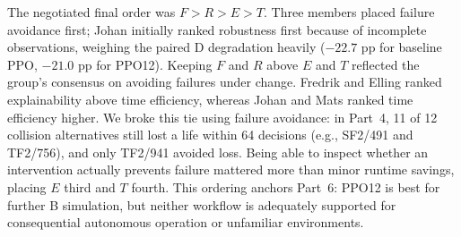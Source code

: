 The negotiated final order was $F>R>E>T$. Three members placed failure avoidance first; Johan
initially ranked robustness first because of incomplete observations, weighing the paired D
degradation heavily ($-22.7$ pp for baseline PPO, $-21.0$ pp for PPO12). Keeping $F$ and $R$
above $E$ and $T$ reflected the group's consensus on avoiding failures under change. Fredrik and
Elling ranked explainability above time efficiency, whereas Johan and Mats ranked time efficiency
higher. We broke this tie using failure avoidance: in Part~4, 11 of 12 collision alternatives
still lost a life within 64 decisions (e.g., SF2/491 and TF2/756), and only TF2/941 avoided loss.
Being able to inspect whether an intervention actually prevents failure mattered more than minor
runtime savings, placing $E$ third and $T$ fourth. This ordering anchors Part~6: PPO12 is best for
further B simulation, but neither workflow is adequately supported for consequential autonomous
operation or unfamiliar environments.
